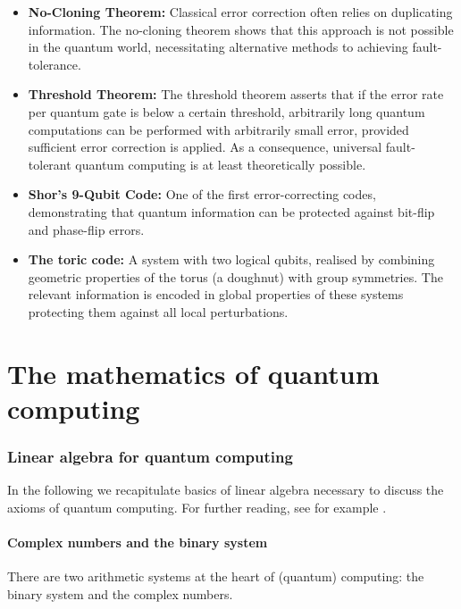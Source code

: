 \documentclass[a4paper, oneside, 12pt]{amsart}
\begin{document}
\begin{itemize}

  \item \textbf{No-Cloning Theorem:}
  Classical error correction often relies on duplicating information.
  The no-cloning theorem shows that this approach is not possible in the quantum world, necessitating alternative methods to achieving fault-tolerance.

  \item \textbf{Threshold Theorem:}
  The threshold theorem asserts that if the error rate per quantum gate is below a certain threshold, arbitrarily long quantum computations can be performed with arbitrarily small error, provided sufficient error correction is applied.
  As a consequence, universal fault-tolerant quantum computing is at least theoretically possible.

  \item \textbf{Shor’s 9-Qubit Code:}
  One of the first error-correcting codes,  demonstrating that quantum information can be protected against bit-flip and phase-flip errors.

  \item \textbf{The toric code:}
  A  system with two logical qubits, realised by combining geometric properties of the torus (\ie a doughnut) with group symmetries.
  The relevant information is encoded in global properties of these systems protecting them against all local perturbations.
\end{itemize}

\part{The mathematics of quantum computing}

\section{Linear algebra for quantum computing}\label{sec:linear-algebra-for-quantum-computing}
In the following we recapitulate basics of linear algebra necessary to discuss the axioms of quantum computing.
For further reading, see for example \cite{axler2024:LinearAlgebraDoneRight, treil2024:LinearAlgebraDoneWrong, blyth1990:ModuleTheoryLinearAlgebra}.

\subsection{Complex numbers and the binary system}\label{sec:complex-numbers}
There are two arithmetic systems at the heart of (quantum) computing: the binary system and the complex numbers.
\end{document}
